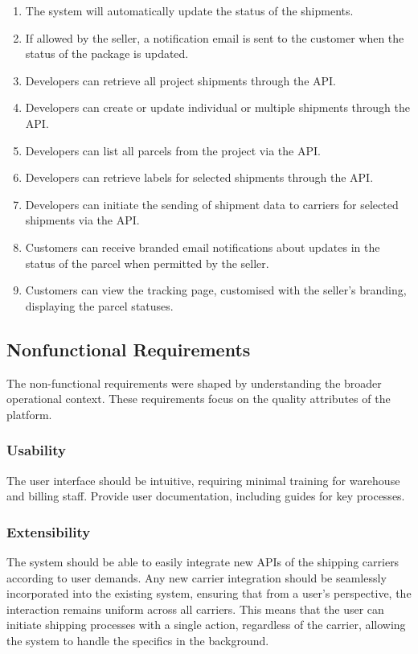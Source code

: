 \begin{enumerate}[label=\bfseries FR\arabic*:]
    \item The system will automatically update the status of the shipments.
    \item If allowed by the seller, a notification email is sent to the customer when the status of the package is updated.
    \item Developers can retrieve all project shipments through the API.
    \item Developers can create or update individual or multiple shipments through the API.
    \item Developers can list all parcels from the project via the API.
    \item Developers can retrieve labels for selected shipments through the API.
    \item Developers can initiate the sending of shipment data to carriers for selected shipments via the API.
    \item Customers can receive branded email notifications about updates in the status of the parcel when permitted by the seller.
    \item Customers can view the tracking page, customised with the seller's branding, displaying the parcel statuses.
\end{enumerate}

\subsection{Nonfunctional Requirements}
\label{subsec:nonfunctional-requirements}
The non-functional requirements were shaped by understanding the broader operational context.
These requirements focus on the quality attributes of the platform.

\subsubsection{Usability}
The user interface should be intuitive, requiring minimal training for warehouse and billing staff.
Provide user documentation, including guides for key processes.

\subsubsection{Extensibility}
The system should be able to easily integrate new APIs of the shipping carriers according to user demands.
Any new carrier integration should be seamlessly incorporated into the existing system, ensuring that from a user's perspective, the interaction remains uniform across all carriers.
This means that the user can initiate shipping processes with a single action, regardless of the carrier, allowing the system to handle the specifics in the background.

